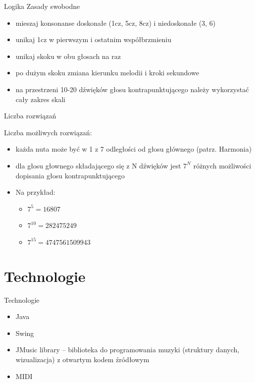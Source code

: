 \documentclass{beamer}
\begin{document}
\begin{frame}{Logika}
	Zasady swobodne
	\begin{itemize}
		\item mieszaj konsonanse doskonałe (1cz, 5cz, 8cz) i niedoskonałe (3, 6)
		\item unikaj 1cz w pierwszym i ostatnim współbrzmieniu
		\item unikaj skoku w obu głosach na raz
		\item po dużym skoku zmiana kierunku melodii i kroki sekundowe
		\item na przestrzeni 10-20 dźwięków głosu kontrapunktującego należy wykorzystać cały zakres skali
	\end{itemize}
\end{frame}

\begin{frame}{Liczba rozwiązań}

	Liczba możliwych rozwiązań:
	\begin{itemize}
		\item każda nuta może być w 1 z 7 odległości od głosu głównego (patrz. Harmonia)
		\item dla głosu głownego składającego się z N dźwięków jest $7^N$ różnych możliwości dopisania głosu kontrapunktującego
		\item Na przykład:
		\begin{itemize}
			\item $7^5 = 16807$
			\item $7^{10} = 282 475 249$
			\item $7^{15} = 4 747 561 509 943$
		\end{itemize}
	\end{itemize}
\end{frame}

\section{Technologie}
\begin{frame}{Technologie}
	\begin{itemize}
		\item Java
		\item Swing
		\item JMusic library – biblioteka do programowania muzyki (struktury danych, wizualizacja) z otwartym kodem źródłowym
		\item MIDI
	\end{itemize}
\end{frame}
\end{document}

